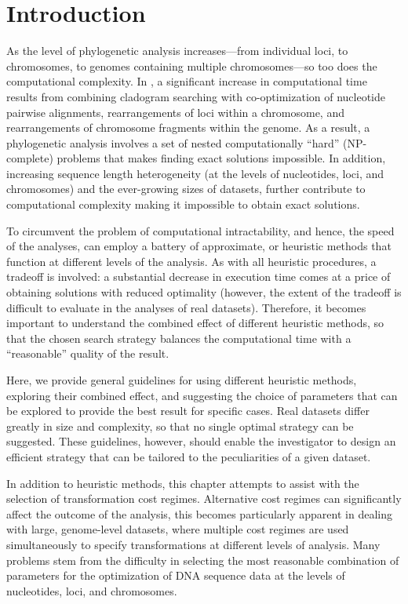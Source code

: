 \section{Introduction}


As the level of phylogenetic analysis increases---from individual loci, to chromosomes, to genomes containing multiple 
chromosomes---so too does the computational complexity. In \poy, a significant increase in computational time results from 
combining cladogram searching with co-optimization of nucleotide pairwise alignments, 
rearrangements of loci within a chromosome, and rearrangements of chromosome fragments within the genome. 
As a result, a phylogenetic analysis involves a set of nested computationally ``hard'' (NP-complete) problems that 
makes finding exact solutions impossible. In addition, increasing sequence length heterogeneity (at the levels of 
nucleotides, loci, and chromosomes) and the ever-growing sizes of datasets, further contribute to computational 
complexity making it impossible to obtain exact solutions.

To circumvent the problem of computational intractability, and hence, the speed of the analyses, \poy can employ a 
battery of approximate, or heuristic methods that function at different levels of the analysis. As with all heuristic procedures, 
a tradeoff is involved: a substantial decrease in execution time comes at a price of obtaining solutions with reduced optimality 
(however, the extent of the tradeoff is difficult to evaluate in the analyses of real datasets). Therefore, it becomes important 
to understand the combined effect of different heuristic methods, so that the chosen search strategy balances the computational 
time with a ``reasonable'' quality of the result.

Here, we provide general guidelines for using different heuristic methods, exploring their combined effect, and suggesting the 
choice of parameters that can be explored to provide the best result for specific cases. Real datasets differ greatly in size 
and complexity, so that no single optimal strategy can be suggested. These guidelines, however, should enable the 
investigator to design an efficient strategy that can be tailored to the peculiarities of a given dataset.

In addition to heuristic methods, this chapter attempts to assist with the selection of transformation cost regimes. 
Alternative cost regimes can significantly affect the outcome of the analysis, this becomes particularly apparent in 
dealing with large, genome-level datasets, where multiple cost regimes are used simultaneously to specify transformations 
at different levels of analysis. Many problems stem from the difficulty in selecting the most reasonable combination of parameters 
for the optimization of DNA sequence data at the levels of nucleotides, loci, and chromosomes.

